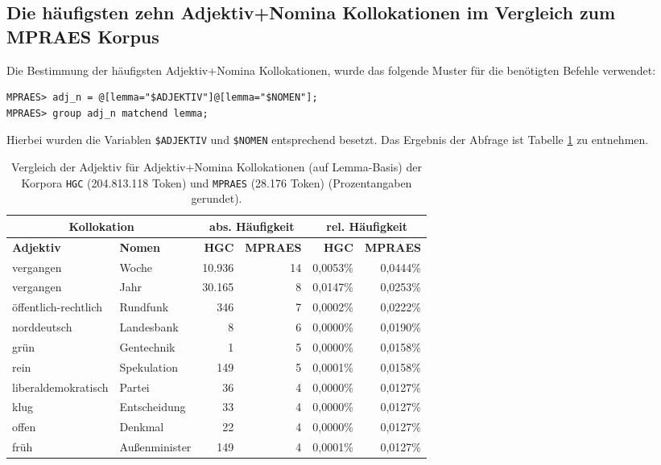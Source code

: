 \documentclass[%
	type=document,%
  	style=article,%
  	media=print,
  	pages=oneside,%
  	prefixLecturer=Dozenten:,
  	author=multiple,
]{unihildesheim} %
\begin{document}
\subsection{Die häufigsten zehn Adjektiv+Nomina Kollokationen im Vergleich zum
MPRAES Korpus}
\label{sec:comparison}
Die Bestimmung der häufigsten Adjektiv+Nomina Kollokationen, wurde das folgende
Muster für die benötigten Befehle verwendet:
\begin{Verbatim}[frame=single,label=CQP,commandchars=\\\{\}]
MPRAES> adj_n = @[lemma="$ADJEKTIV"]@[lemma="$NOMEN"];
MPRAES> group adj_n matchend lemma;
\end{Verbatim}
Hierbei wurden die Variablen \texttt{\$ADJEKTIV} und \texttt{\$NOMEN}
entsprechend  besetzt. Das Ergebnis der Abfrage ist
Tabelle \ref{tab:compare_adj_n} zu entnehmen.
\begin{table}[!hpb]\label{t}
	\center
	\begin{tabularx}{\textwidth}{llrrrr}
		\toprule
		\multicolumn{2}{c}{\textbf{Kollokation}} & \multicolumn{2}{c}{\textbf{abs.
		Häufigkeit}} & \multicolumn{2}{c}{\textbf{rel. Häufigkeit}} \\
		\midrule
		\textbf{Adjektiv} & \textbf{Nomen} & \textbf{HGC} & \textbf{MPRAES}
		&	\textbf{HGC} & \textbf{MPRAES} \\
		\midrule
		vergangen & Woche & 10.936 & 14 & 0,0053\% & 0,0444\%\\
		vergangen & Jahr & 30.165 & 8 & 0,0147\% & 0,0253\%\\
		öffentlich-rechtlich & Rundfunk & 346 & 7 & 0,0002\% & 0,0222\%\\
		norddeutsch & Landesbank & 8 & 6 & 0,0000\% & 0,0190\%\\
		grün & Gentechnik & 1 & 5 & 0,0000\% & 0,0158\%\\
		rein & Spekulation & 149 & 5 & 0,0001\% & 0,0158\%\\
		liberaldemokratisch & Partei & 36 & 4 & 0,0000\% & 0,0127\%\\
		klug & Entscheidung & 33 & 4 & 0,0000\% & 0,0127\%\\
		offen & Denkmal & 22 & 4 & 0,0000\% & 0,0127\%\\
		früh & Außenminister & 149 & 4 & 0,0001\% & 0,0127\%\\
		\bottomrule
	\end{tabularx}
	\caption{Vergleich der Adjektiv für Adjektiv+Nomina Kollokationen (auf
	Lemma-Basis) der Korpora \texttt{HGC} (204.813.118 Token) und \texttt{MPRAES} (28.176 Token)
	 (Prozentangaben gerundet).}
	\label{tab:compare_adj_n}
\end{table}
\end{document}
